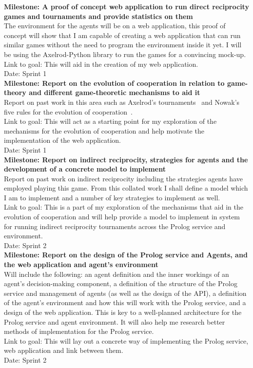 \documentclass{article}
\begin{document}
\noindent\textbf{Milestone: A proof of concept web application to run direct reciprocity games and tournaments and provide statistics on them}\\
The environment for the agents will be on a web application, this proof of concept will show that I am capable of creating a web application that can run similar games without the need to program the environment inside it yet. I will be using the Axelrod-Python library to run the games for a convincing mock-up.\\
Link to goal: This will aid in the creation of my web application.\\
Date: Sprint 1\\

\noindent\textbf{Milestone: Report on the evolution of cooperation in relation to game-theory and different game-theoretic mechanisms to aid it}\\
Report on past work in this area such as Axelrod's tournaments~\cite{evolution_of_cooperation} and Nowak's five rules for the evolution of cooperation~\cite{five_rules_coop}.\\
Link to goal: This will act as a starting point for my exploration of the mechanisms for the evolution of cooperation and help motivate the implementation of the web application.\\
Date: Sprint 1\\

\noindent\textbf{Milestone: Report on indirect reciprocity, strategies for agents and the development of a concrete model to implement}\\
Report on past work on indirect reciprocity including the strategies agents have employed playing this game. From this collated work I shall define a model which I am to implement and a number of key strategies to implement as well.\\
Link to goal: This is a part of my exploration of the mechanisms that aid in the evolution of cooperation and will help provide a model to implement in system for running indirect reciprocity tournaments across the Prolog service and environment.\\
Date: Sprint 2\\

\noindent\textbf{Milestone: Report on the design of the Prolog service and Agents, and the web application and agent's environment}\\
Will include the following: an agent definition and the inner workings of an agent's decision-making component, a definition of the structure of the Prolog service and management of agents (as well as the design of the API), a definition of the agent's environment and how this will work with the Prolog service, and a design of the web application. This is key to a well-planned architecture for the Prolog service and agent environment. It will also help me research better methods of implementation for the Prolog service.\\
Link to goal: This will lay out a concrete way of implementing the Prolog service, web application and link between them.\\
Date: Sprint 2\\
\end{document}
